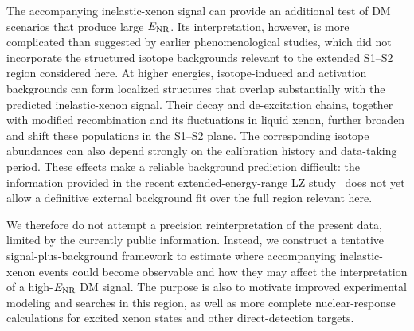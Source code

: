 \documentclass[11pt,a4paper]{article}
\begin{document}
The accompanying inelastic-xenon signal can provide an additional test of DM scenarios that produce large $E_{\rm NR}$. Its interpretation, however, is more complicated than suggested by earlier phenomenological studies, which did not incorporate the structured isotope backgrounds relevant to the extended S1--S2 region considered here. At higher energies, isotope-induced and activation backgrounds can form localized structures that overlap substantially with the predicted inelastic-xenon signal. Their decay and de-excitation chains, together with modified recombination and its fluctuations in liquid xenon, further broaden and shift these populations in the S1--S2 plane. The corresponding isotope abundances can also depend strongly on the calibration history and data-taking period. These effects make a reliable background prediction difficult: the information provided in the recent extended-energy-range LZ study~\cite{LZ2026} does not yet allow a definitive external background fit over the full region relevant here.

We therefore do not attempt a precision reinterpretation of the present data, limited by the currently public information. Instead, we construct a tentative signal-plus-background framework to estimate where accompanying inelastic-xenon events could become observable and how they may affect the interpretation of a high-$E_{\rm NR}$ DM signal. The purpose is also to motivate improved experimental modeling and searches in this region, as well as more complete nuclear-response calculations for excited xenon states and other direct-detection targets. %
\end{document}
